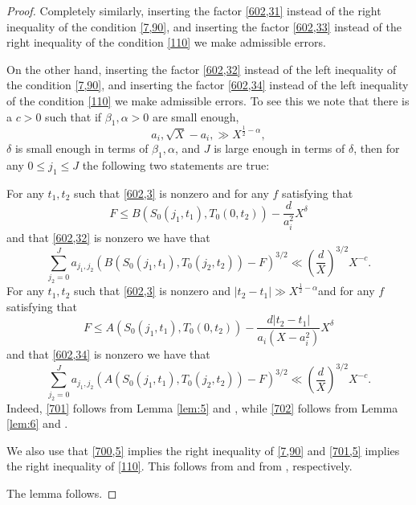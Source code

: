 \documentclass[12pt]{amsart}
\theoremstyle{definition}
\numberwithin{equation}{section}
\begin{document}
\begin{proof}
Completely similarly, inserting the factor \eqref{602,31} instead of the right inequality of
the condition \eqref{7,90}, and inserting the factor \eqref{602,33} instead of the right inequality of
the condition \eqref{110} we make admissible errors.


On the other hand, inserting the factor \eqref{602,32} instead of the left inequality of
the condition \eqref{7,90}, and inserting the factor
\eqref{602,34} instead of the left inequality of the
condition \eqref{110} we make admissible errors. To
see this we note that there is a $c>0$ such that if $\beta_1,\alpha
>0$ are small enough,
\[a_i,\sqrt {X}-a_i,\gg X^{\frac 12-\alpha},\]
$\delta$ is small enough in terms of $\beta_1,\alpha$, and $J$ is large enough in terms
of $\delta$, then for any $0\le j_1\le J$ the following two statements are true:

For any $t_1,t_2$ such that \eqref{602,3} is nonzero and for any $
f$ satisfying that
\begin{equation}F\le B\left(S_0\left(j_1,t_1\right),T_0\left(0,t_
2\right)\right)-\frac d{a_i^2}X^{\delta}\label{700,5}\end{equation}
and that \eqref{602,32} is nonzero we have that
\begin{equation}\sum_{j_2=0}^Ja_{j_1,j_2}\left(B\left(S_0\left(j_
1,t_1\right),T_0\left(j_2,t_2\right)\right)-F\right)^{3/2}\ll\left
(\frac dX\right)^{3/2}X^{-c}.\label{701}\end{equation}
For any $t_1,t_2$ such that \eqref{602,3} is nonzero and
$\left|t_2-t_1\right|\gg X^{\frac 12-\alpha}$and for any $f$ satisfying that
\begin{equation}F\le A\left(S_0\left(j_1,t_1\right),T_0\left(0,t_
2\right)\right)-\frac {d\left|t_2-t_1\right|}{a_i\left(X-a_i^2\right
)}X^{\delta}\label{701,5}\end{equation}
and that \eqref{602,34} is nonzero we have that
\begin{equation}\sum_{j_2=0}^Ja_{j_1,j_2}\left(A\left(S_0\left(j_
1,t_1\right),T_0\left(j_2,t_2\right)\right)-F\right)^{3/2}\ll\left
(\frac dX\right)^{3/2}X^{-c}.\label{702}\end{equation}
Indeed, \eqref{701} follows from Lemma \ref{lem:5} and
\cite[(6.62)]{Biro}, while \eqref{702} follows from Lemma
\ref{lem:6} and \cite[(6.51)]{Biro}.

We also use that \eqref{700,5} implies the right
inequality of \eqref{7,90} and \eqref{701,5} implies the right
inequality of \eqref{110}. This follows from \cite[(6.28)]{Biro} and from \cite[(6.29)]{Biro},
respectively.

The lemma follows.
\end{proof}
\end{document}
